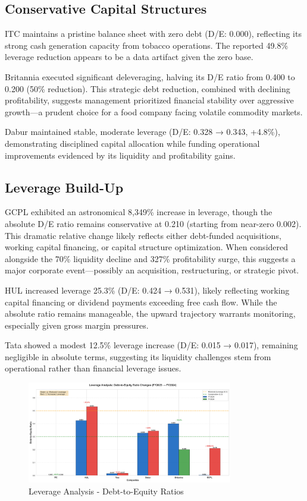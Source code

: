 \documentclass[12pt, a4paper]{report}
\begin{document}
\subsection{Conservative Capital Structures}

ITC maintains a pristine balance sheet with zero debt (D/E: 0.000), reflecting its strong cash generation capacity from tobacco operations. The reported 49.8\% leverage reduction appears to be a data artifact given the zero base.

Britannia executed significant deleveraging, halving its D/E ratio from 0.400 to 0.200 (50\% reduction). This strategic debt reduction, combined with declining profitability, suggests management prioritized financial stability over aggressive growth—a prudent choice for a food company facing volatile commodity markets.

Dabur maintained stable, moderate leverage (D/E: 0.328 → 0.343, +4.8\%), demonstrating disciplined capital allocation while funding operational improvements evidenced by its liquidity and profitability gains.

\subsection{Leverage Build-Up}

GCPL exhibited an astronomical 8,349\% increase in leverage, though the absolute D/E ratio remains conservative at 0.210 (starting from near-zero 0.002). This dramatic relative change likely reflects either debt-funded acquisitions, working capital financing, or capital structure optimization. When considered alongside the 70\% liquidity decline and 327\% profitability surge, this suggests a major corporate event—possibly an acquisition, restructuring, or strategic pivot.

HUL increased leverage 25.3\% (D/E: 0.424 → 0.531), likely reflecting working capital financing or dividend payments exceeding free cash flow. While the absolute ratio remains manageable, the upward trajectory warrants monitoring, especially given gross margin pressures.

Tata showed a modest 12.5\% leverage increase (D/E: 0.015 → 0.017), remaining negligible in absolute terms, suggesting its liquidity challenges stem from operational rather than financial leverage issues.

\begin{figure}[H]
    \centering
    \includegraphics[width=0.8\textwidth]{assets/imperative_analysis/leverage_analysis.png}
    \caption{Leverage Analysis - Debt-to-Equity Ratios}
\end{figure}
\end{document}
